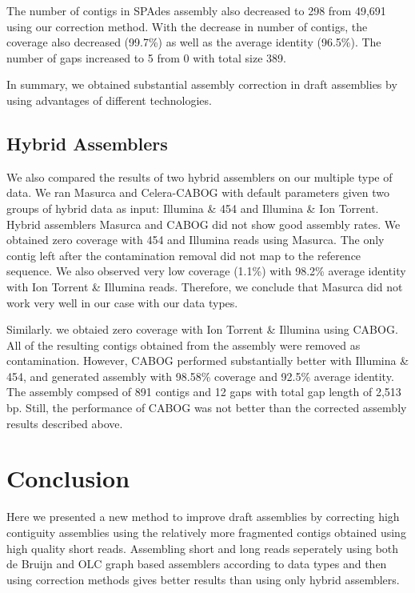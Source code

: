 \documentclass{llncs}
\begin{document}
The number of contigs in SPAdes assembly also decreased to 298 from 49,691 using our correction method. With the decrease in number of contigs, the coverage also decreased (99.7\%) as well as the average identity (96.5\%). The number of gaps increased to 5 from 0 with total size 389.

In summary, we obtained substantial assembly correction
 in draft assemblies by using advantages of different technologies.

\subsection{Hybrid Assemblers}

We also compared the results of two hybrid assemblers on our multiple type of data. We ran Masurca and Celera-CABOG with default parameters given two groups of hybrid data as input: Illumina \& 454 and Illumina \& Ion Torrent. Hybrid assemblers Masurca and CABOG did not show good assembly rates.
 We obtained zero coverage  with 454 and Illumina reads using Masurca. The only contig left after the contamination removal did not map to the reference sequence. We also observed very low coverage (1.1\%) with 98.2\% average identity  with Ion Torrent \& Illumina reads. Therefore, we conclude that Masurca did not work very well in our case with our data types. 

Similarly. we obtaied zero coverage with Ion Torrent \& Illumina using CABOG. All of the resulting contigs obtained from the assembly were removed as contamination. However, CABOG performed substantially better with
Illumina \& 454, and generated assembly with 98.58\% coverage and 92.5\% average identity.
The assembly compsed of 891 contigs and 12 gaps with total gap length of 2,513 bp. Still, 
the performance of CABOG was not better than the  corrected assembly results described above.

\section{Conclusion}

Here we presented a new method to improve draft assemblies by correcting high contiguity assemblies using the relatively more fragmented contigs obtained using high quality short reads. Assembling short and long reads seperately using both de Bruijn and OLC graph based assemblers according to data types and then using correction methods  gives better results than using only hybrid assemblers.
\end{document}
